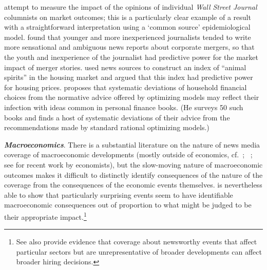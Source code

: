 \href{https://www.researchgate.net/publication/227465410_Journalists_and_the_Stock_Market}{\cite{dougal2012journalists}} attempt to measure the impact of the opinions of individual \textit{Wall Street Journal} columnists on market outcomes; this is a particularly clear example of a result with a straightforward interpretation using a `common source' epidemiological model.  \href{https://www.public.asu.edu/~dsosyura/ResearchPapers/Rumor\%20Has\%20It\%20--\%20Sensationalism\%20in\%20Financial\%20Media.pdf}{\cite{ahern2015rumor}} found that younger and more inexperienced journalists tended to write more sensational and ambiguous news reports about corporate mergers, so that the youth and inexperience of the journalist had predictive power for the market impact of merger stories. %
\href{https://www.stern.nyu.edu/sites/default/files/assets/documents/con_040497.pdf}{\cite{soo_quantifying_2015}} used news sources to construct an index of ``animal spirits'' in the housing market and argued that this index had predictive power for housing prices.  \cite{choi2022popular} proposes that systematic deviations of household financial choices from the normative advice offered by optimizing models may reflect their infection with ideas common in personal finance books. (He surveys 50 such books and finds a host of systematic deviations of their advice from the recommendations made by standard rational optimizing models.)

\textbf{\textit{Macroeconomics}}.  There is a substantial literature on the nature of news media coverage of macroeconomic developments (mostly outside of economics, cf.~\cite{soroka2015s}; ~\cite{damstra2021economy}; see  \cite{bybee2020structure} for recent work by economists), but the slow-moving nature of macroeconomic outcomes makes it difficult to distinctly identify consequences of the nature of the coverage from the consequences of the economic events themselves.  \cite{nimark2014man} is nevertheless able to show that particularly surprising events seem to have identifiable macroeconomic consequences out of proportion to what might be judged to be their appropriate impact.\footnote{See also \cite{chahrour2021sectoral} provide evidence that coverage about newsworthy events that affect particular sectors but are unrepresentative of broader developments can affect broader hiring decisions.}

